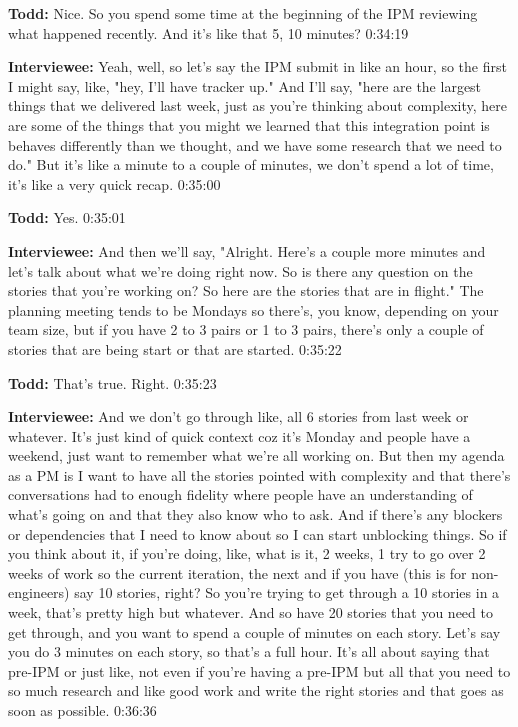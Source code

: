 \textbf{Todd:} Nice.  So you spend some time at the beginning of the IPM reviewing what happened recently. And it's like that 5, 10 minutes?   0:34:19

\textbf{Interviewee:} Yeah, well, so let's say the IPM submit in like an hour, so the first I might say, like, "hey, I'll have tracker up."  And I'll say, "here are the largest things that we delivered last week, just as you're thinking about complexity, here are some of the things that you might we learned that this integration point is behaves differently than we thought, and we have some research that we need to do."  But it's like a minute to a couple of minutes, we don't spend a lot of time, it's like a very quick recap.   0:35:00

\textbf{Todd:} Yes.   0:35:01

\textbf{Interviewee:} And then we'll say, "Alright.  Here's a couple more minutes and let's talk about what we're doing right now.  So is there any question on the stories that you're working on? So here are the stories that are in flight."  The planning meeting tends to be Mondays so there's, you know, depending on your team size, but if you have 2 to 3 pairs or 1 to 3 pairs, there's only a couple of stories that are being start or that are started.   0:35:22

\textbf{Todd:} That's true. Right.   0:35:23

\textbf{Interviewee:} And we don't go through like, all 6 stories from last week or whatever. It's just kind of quick context coz it's Monday and people have a weekend, just want to remember what we're all working on.  But then my agenda as a PM is I want to have all the stories pointed with complexity and that there's conversations had to enough fidelity where people have an understanding of what's going on and that they also know who to ask.  And if there's any blockers or dependencies that I need to know about so I can start unblocking things.  So if you think about it, if you're doing, like, what is it, 2 weeks, 1 try to go over 2 weeks of work so the current iteration, the next and if you have (this is for non-engineers) say 10 stories, right?  So you're trying to get through a 10 stories in a week, that's pretty high but whatever.  And so have 20 stories that you need to get through, and you want to spend a couple of minutes on each story.  Let's say you do 3 minutes on each story, so that's a full hour.  It's all about saying that pre-IPM or just like, not even if you're having a pre-IPM but all that you need to so much research and like good work and write the right stories and that goes as soon as possible.   0:36:36

